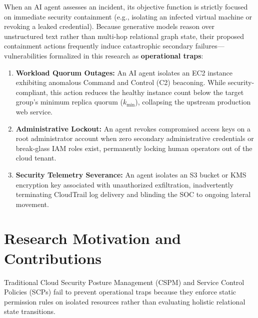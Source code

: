 \documentclass[12pt,a4paper]{report}
\begin{document}
When an AI agent assesses an incident, its objective function is strictly focused on immediate security containment (e.g., isolating an infected virtual machine or revoking a leaked credential). Because generative models reason over unstructured text rather than multi-hop relational graph state, their proposed containment actions frequently induce catastrophic secondary failures---vulnerabilities formalized in this research as \textbf{operational traps}:
\begin{enumerate}
    \item \textbf{Workload Quorum Outages:} An AI agent isolates an EC2 instance exhibiting anomalous Command and Control (C2) beaconing. While security-compliant, this action reduces the healthy instance count below the target group's minimum replica quorum ($k_{\text{min}}$), collapsing the upstream production web service.
    \item \textbf{Administrative Lockout:} An agent revokes compromised access keys on a root administrator account when zero secondary administrative credentials or break-glass IAM roles exist, permanently locking human operators out of the cloud tenant.
    \item \textbf{Security Telemetry Severance:} An agent isolates an S3 bucket or KMS encryption key associated with unauthorized exfiltration, inadvertently terminating CloudTrail log delivery and blinding the SOC to ongoing lateral movement.
\end{enumerate}

\section{Research Motivation and Contributions}\label{sec:contributions}
Traditional Cloud Security Posture Management (CSPM) and Service Control Policies (SCPs) fail to prevent operational traps because they enforce static permission rules on isolated resources rather than evaluating holistic relational state transitions.
\end{document}

